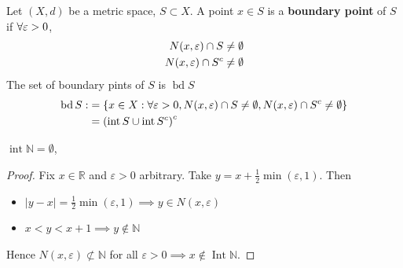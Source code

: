 \begin{definition}[Boundary]
    Let $(X, d)$ be a metric space, 
    $S \subset X$. 
    A point $x \in S$ is a \textbf{boundary point} of $S$ if 
    $\forall \varepsilon > 0$,
    \begin{align*}
        N (x, \varepsilon) \cap S \neq \emptyset \\
        N (x, \varepsilon) \cap S^c \neq \emptyset
    \end{align*}
    The set of boundary pints of $S$ is $\operatorname{bd} S$
    \begin{align*}
        \operatorname{bd} S :&= \{ 
            x \in X: 
            \forall \varepsilon > 0, 
            N(x, \varepsilon) \cap S \neq \emptyset,
            N(x, \varepsilon) \cap S^c \neq \emptyset
        \}  \\
        &= \left( \operatorname{int} S \cup \operatorname{int} S^c \right)^c
    \end{align*}
\end{definition}

\begin{example}
    $\operatorname{int} \mathbb{N} = \emptyset$, 
\end{example}
\begin{proof}
    Fix $x \in \mathbb{R}$ and $\varepsilon > 0$ arbitrary. 
    Take $y = x + \frac{1}{2} \min (\varepsilon, 1)$. Then 
    \begin{itemize}
        \item $|y - x| = \frac{1}{2} \min (\varepsilon, 1) \implies y \in N(x, \varepsilon)$
        \item $x < y < x + 1 \implies y \notin \mathbb{N}$ 
    \end{itemize} 
    Hence $N(x, \varepsilon) \not \subset \mathbb{N}$ for all $\varepsilon > 0 \implies x \notin \operatorname{Int}  \mathbb{N}$.
\end{proof}

